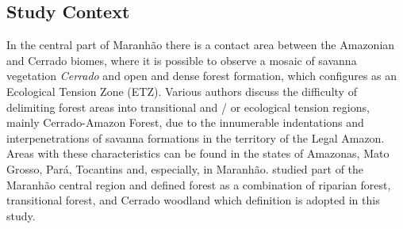 \subsection{Study Context} %



In the central part of Maranhão there is a contact area between the Amazonian and Cerrado biomes, where it is possible to observe a mosaic of savanna vegetation \textit{Cerrado} and open and dense forest formation, which configures as an Ecological Tension Zone (ETZ). Various authors discuss the difficulty of delimiting forest areas into transitional and / or ecological tension regions, mainly Cerrado-Amazon Forest, due to the innumerable indentations and interpenetrations of savanna formations in the territory of the Legal Amazon. Areas with these characteristics can be found in the states of Amazonas, Mato Grosso, Pará, Tocantins and, especially, in Maranhão. \citet{GARCIA201716} studied part of the Maranhão central region and defined forest as a combination of riparian forest, transitional forest, and Cerrado woodland which definition is adopted in this study.




 




